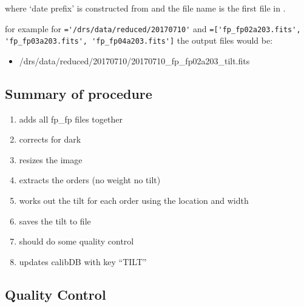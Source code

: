 \noindent where `date prefix' is constructed from \argnightname and the file name is the first file in \argfilenames.

\noindent for example for \reduceddir\lstinline[style=pythoninline]|='/drs/data/reduced/20170710'| and \argfilenames\lstinline[style=pythoninline]|=['fp_fp02a203.fits', 'fp_fp03a203.fits', 'fp_fp04a203.fits']| the output files would be:
\begin{tcustomdir}
\begin{itemize}
\item /drs/data/reduced/20170710/20170710\_fp\_fp02a203\_tilt.fits
\end{itemize}
\end{tcustomdir}

\subsection{Summary of procedure}
\begin{enumerate}
\item adds all fp\_fp files together
\item corrects for dark
\item resizes the image
\item extracts the orders (no weight no tilt)
\item works out the tilt for each order using the location and width
\item saves the tilt to file
\item should do some quality control
\item  updates calibDB with key ``TILT''
\end{enumerate}


\subsection{Quality Control}

